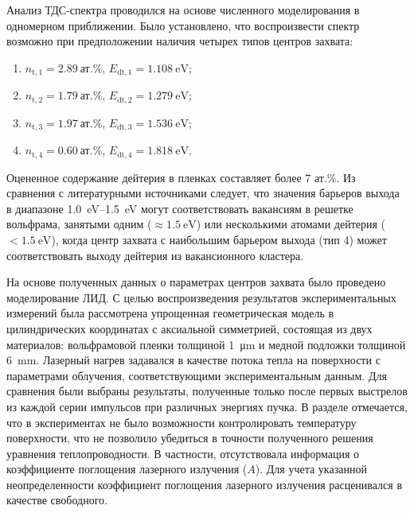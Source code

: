 Анализ ТДС-спектра проводился на основе численного моделирования в одномерном приближении. Было установлено, что воспроизвести спектр возможно при предположении наличия четырех типов центров захвата:
\begin{enumerate}[beginpenalty=10000]
    \item \( n_\mathrm{t,1}=\SI{2.89}{\text{ат.}\percent} \), \( E_\mathrm{dt,1}=\SI{1.108}{\electronvolt} \);
    \item \( n_\mathrm{t,2}=\SI{1.79}{\text{ат.}\percent} \), \( E_\mathrm{dt,2}=\SI{1.279}{\electronvolt} \);
    \item \( n_\mathrm{t,3}=\SI{1.97}{\text{ат.}\percent} \), \( E_\mathrm{dt,3}=\SI{1.536}{\electronvolt} \);
    \item \( n_\mathrm{t,4}=\SI{0.60}{\text{ат.}\percent} \), \( E_\mathrm{dt,4}=\SI{1.818}{\electronvolt} \).
\end{enumerate}
Оцененное содержание дейтерия в пленках составляет более 7 ат.\%. Из сравнения с литературными источниками следует, что значения барьеров выхода в диапазоне \SIrange{1.0}{1.5}{\electronvolt} могут соответствовать вакансиям в решетке вольфрама, занятыми одним (\(\approx\SI{1.5}{\electronvolt}\)) или несколькими атомами дейтерия (\(<\SI{1.5}{\electronvolt}\)), когда центр захвата с наибольшим барьером выхода (тип 4) может соответствовать выходу дейтерия из вакансионного кластера. 

На основе полученных данных о параметрах центров захвата было проведено моделирование ЛИД. С целью воспроизведения результатов экспериментальных измерений была рассмотрена упрощенная геометрическая модель в цилиндрических координатах с аксиальной симметрией, состоящая из двух материалов: вольфрамовой пленки толщиной \SI{1}{\micro\meter} и медной подложки толщиной \SI{6}{\milli\meter}. Лазерный нагрев задавался в качестве потока тепла на поверхности с параметрами облучения, соответствующими экспериментальным данным. Для сравнения были выбраны результаты, полученные только после первых выстрелов из каждой серии импульсов при различных энергиях пучка. В разделе отмечается, что в экспериментах не было возможности контролировать температуру поверхности, что не позволило убедиться в точности полученного решения уравнения теплопроводности. В частности, отсутствовала информация о коэффициенте поглощения лазерного излучения (\( A \)). Для учета указанной неопределенности коэффициент поглощения лазерного излучения расценивался в качестве свободного.


